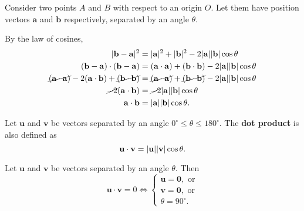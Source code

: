 \documentclass[12pt]{article}
\renewcommand{\vec}{\mathbf}
\begin{document}
\begin{disc}
	Consider two points \(A\) and \(B\) with respect to an origin \(O\). 
	Let them have position vectors \(\vec{a}\) and \(\vec{b}\) respectively, separated by an angle \(\theta\).
	\begin{figure}[H]
		\centering
	\end{figure}
	By the law of cosines,
	\begin{align*}
		 \abs{\vec{b} - \vec{a}}^2 &= \abs{\vec{a}}^2 + \abs{\vec{b}}^2 - 2 \abs{\vec{a}} \abs{\vec{b}} \cos \theta  \\
		  (\vec{b} - \vec{a}) \cdot (\vec{b} - \vec{a}) &= (\vec{a} \cdot \vec{a}) + (\vec{b} \cdot \vec{b}) - 2 \abs{\vec{a}} \abs{\vec{b}} \cos \theta \\
		  \cancel{(\vec{a} \cdot \vec{a})} - 2 (\vec{a} \cdot \vec{b}) + \cancel{(\vec{b} \cdot \vec{b})} &= \cancel{(\vec{a} \cdot \vec{a})} + \cancel{(\vec{b} \cdot \vec{b})} - 2 \abs{\vec{a}} \abs{\vec{b}} \cos \theta \\
		  \cancel{-2} (\vec{a} \cdot \vec{b}) &= \cancel{-2} \abs{\vec{a}} \abs{\vec{b}} \cos \theta \\
		  \vec{a} \cdot \vec{b} &= \abs{\vec{a}} \abs{\vec{b}} \cos \theta.
	\end{align*}
\end{disc}

\begin{defn} \label{defn:gdpdt}
	Let \(\vec{u}\) and \(\vec{v}\) be vectors separated by an angle \(0^\circ \leq \theta \leq 180^\circ\).
	The \textbf{dot product} is also defined as 
	\[ \vec{u} \cdot \vec{v} = \abs{\vec{u}} \abs{\vec{v}} \cos \theta. \] 
\end{defn}

\begin{thm}
	Let \(\vec{u}\) and \(\vec{v}\) be vectors separated by an angle \(\theta\).
	Then
	\[ \vec{u} \cdot \vec{v} = 0 \iff 
		\begin{cases}
			\vec{u} = \vec{0}, \text{ or} \\
			\vec{v} = \vec{0}, \text{ or} \\
			\theta = 90^\circ.
		\end{cases}
	\] 
\end{thm}
\end{document}

